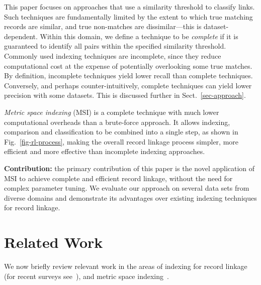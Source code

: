 \documentclass{llncs}
\begin{document}
This paper focuses on approaches that use a similarity threshold to
classify links. Such techniques are fundamentally limited by the extent
to which true matching records are similar, and true non-matches are
dissimilar---this is dataset-dependent. Within this domain, we define
a technique to be \emph{complete} if it is guaranteed to identify all
pairs within the specified similarity threshold. Commonly used indexing
techniques are incomplete, since they reduce computational cost at the
expense of potentially overlooking some true matches. By definition,
incomplete techniques yield lower recall than complete techniques.
Conversely, and perhaps counter-intuitively, complete techniques can
yield lower precision with some datasets. This is discussed further in
Sect.~\ref{sec-approach}.

\emph{Metric space indexing} (MSI) is a complete technique with much
lower computational overheads than a brute-force approach. It allows
indexing, comparison and classification to be combined into a single
step, as shown in Fig.~\ref{fig-rl-process}, making the overall record
linkage process simpler, more efficient and more effective than
incomplete indexing approaches.

\textbf{Contribution:} the primary contribution of this paper is the
novel application of MSI to achieve complete and efficient record
linkage, without the need for complex parameter tuning. We evaluate our
approach on several data sets from diverse domains and demonstrate its
advantages over existing indexing techniques for record linkage.



\section{Related Work}
\label{sec-related}

We now briefly review relevant work in the areas of indexing for record
linkage (for recent surveys see~\cite{Chr12b,Pap16}), and metric space
indexing~\cite{Zezula2010}.
\end{document}
